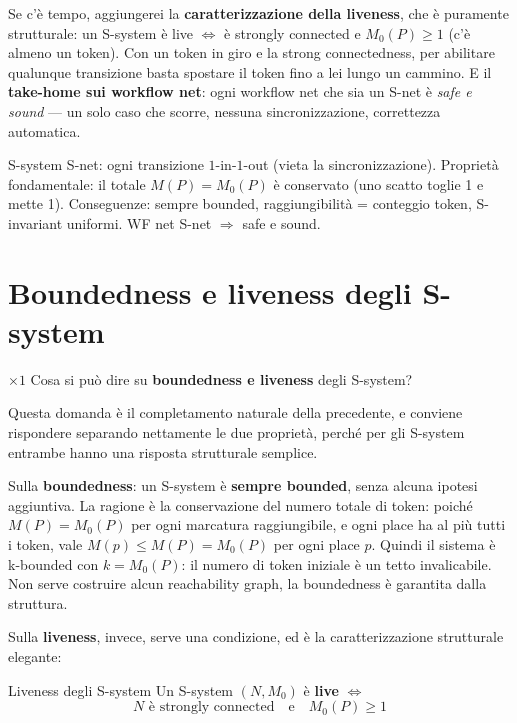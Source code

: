 Se c'è tempo, aggiungerei la \textbf{caratterizzazione della liveness}, che è puramente strutturale: un S-system è live $\iff$ è strongly connected e $M_0(P) \ge 1$ (c'è almeno un token). Con un token in giro e la strong connectedness, per abilitare qualunque transizione basta spostare il token fino a lei lungo un cammino. E il \textbf{take-home sui workflow net}: ogni workflow net che sia un S-net è \emph{safe e sound} — un solo caso che scorre, nessuna sincronizzazione, correttezza automatica.

\begin{puntochiave}{S-system}
S-net: ogni transizione $1$-in-$1$-out (vieta la sincronizzazione). Proprietà fondamentale: il totale $M(P)=M_0(P)$ è conservato (uno scatto toglie 1 e mette 1). Conseguenze: sempre bounded, raggiungibilità = conteggio token, S-invariant uniformi. WF net S-net $\Rightarrow$ safe e sound.
\end{puntochiave}

\section{Boundedness e liveness degli S-system}

\begin{domanda}{$\times 1$}
Cosa si può dire su \textbf{boundedness e liveness} degli S-system?
\end{domanda}

Questa domanda è il completamento naturale della precedente, e conviene rispondere separando nettamente le due proprietà, perché per gli S-system entrambe hanno una risposta strutturale semplice.

Sulla \textbf{boundedness}: un S-system è \textbf{sempre bounded}, senza alcuna ipotesi aggiuntiva. La ragione è la conservazione del numero totale di token: poiché $M(P) = M_0(P)$ per ogni marcatura raggiungibile, e ogni place ha al più tutti i token, vale $M(p) \le M(P) = M_0(P)$ per ogni place $p$. Quindi il sistema è k-bounded con $k = M_0(P)$: il numero di token iniziale è un tetto invalicabile. Non serve costruire alcun reachability graph, la boundedness è garantita dalla struttura.

Sulla \textbf{liveness}, invece, serve una condizione, ed è la caratterizzazione strutturale elegante:

\begin{teorema}{Liveness degli S-system}
Un S-system $(N,M_0)$ è \textbf{live} $\iff$
$$N \text{ è strongly connected} \quad\text{e}\quad M_0(P) \ge 1$$
\end{teorema}

